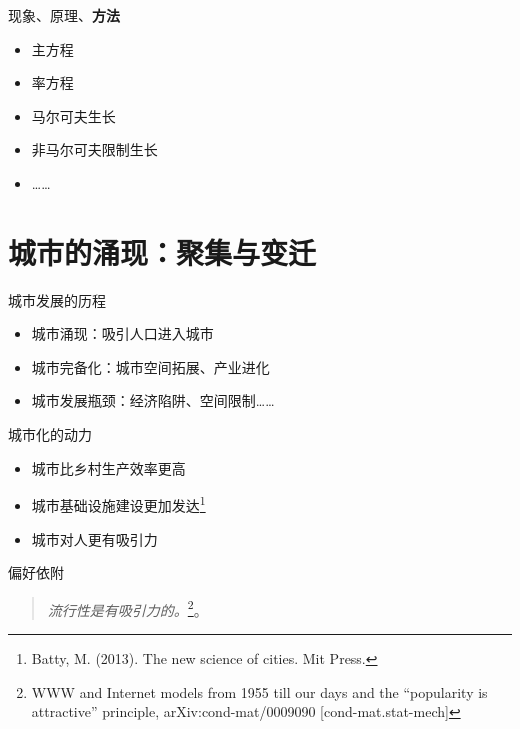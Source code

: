 \documentclass[utf8]{ctexbeamer}
\begin{document}
\begin{frame}{现象、原理、\textbf{方法}}
    \begin{itemize}
        \item 主方程
        \item 率方程
        \item 马尔可夫生长
        \item 非马尔可夫限制生长
        \item ……
    \end{itemize}
\end{frame}



\section{城市的涌现：聚集与变迁}

\begin{frame}{城市发展的历程}
    \begin{itemize}
        \item 城市涌现：吸引人口进入城市
        \item 城市完备化：城市空间拓展、产业进化
        \item 城市发展瓶颈：经济陷阱、空间限制……
    \end{itemize}
\end{frame}

\begin{frame}{城市化的动力}
    \begin{itemize}
        \item 城市比乡村生产效率更高
        \item 城市基础设施建设更加发达\footnote{Batty, M. (2013). The new science of cities. Mit Press.}
        \vspace{1cm}
        \item 城市对人更有吸引力
    \end{itemize}
\end{frame}

\begin{frame}{偏好依附}
    \begin{quote}
        \emph{流行性是有吸引力的。}\footnote{WWW and Internet models from 1955 till our days and the “popularity is attractive” principle, arXiv:cond-mat/0009090 [cond-mat.stat-mech]}。
    \end{quote}
\end{frame}
\end{document}
